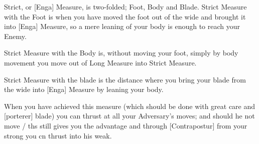 Strict, or [Enga] Measure, is two-folded;
Foot, Body and Blade. Strict Measure with the Foot is when you have
moved the foot out of the wide and brought it into [Enga] Measure, so
a mere leaning of your body is enough to reach your Enemy.

Strict Measure with the Body is, without moving your foot, simply by
body movement you move out of Long Measure into Strict Measure.

Strict Measure with the blade is the distance where you bring your
blade from the wide into [Enga] Measure by leaning your body.


When you have achieved this measure  (which should be done with great
care and [porterer] blade) you can thrust at all your Adversary's
moves; and should he not move / ths still gives you the advantage  and
through [Contrapostur] from your strong you cn thrust into his weak.